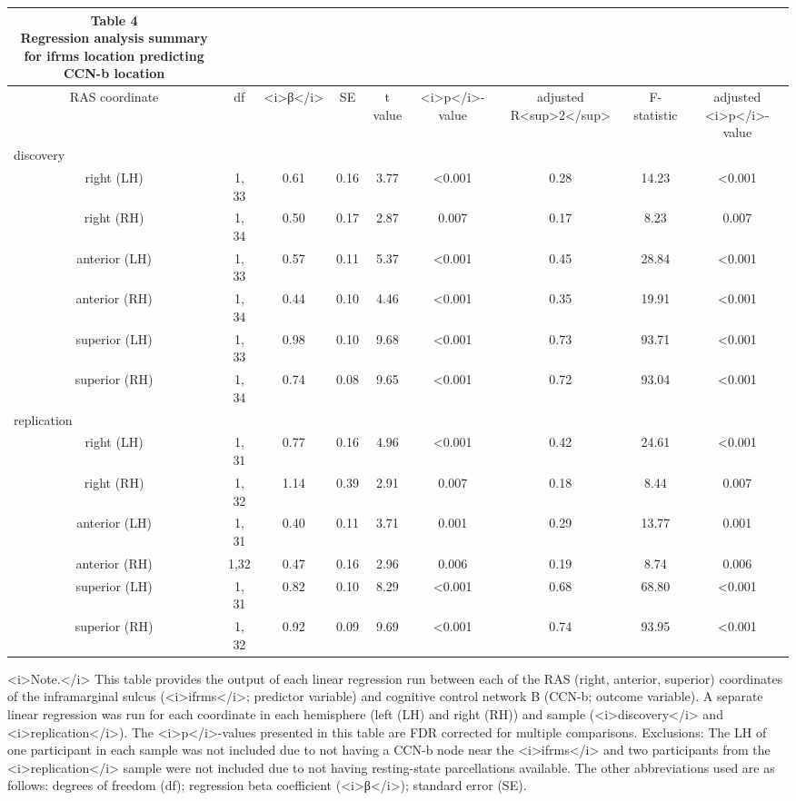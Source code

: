 \documentclass[
]{article}
\begin{document}
\captionsetup[table]{labelformat=empty,skip=1pt}
\begin{longtable}{ccccccccc}
\caption*{
\large Table 4\\ 
\small Regression analysis summary for ifrms location predicting CCN-b location\\ 
} \\ 
\toprule
RAS coordinate & df & <i>β</i> & SE & t value & <i>p</i>-value & adjusted R<sup>2</sup> & F-statistic & adjusted <i>p</i>-value \\ 
\midrule
\multicolumn{1}{l}{discovery} \\ 
\midrule
right (LH) & 1, 33 & 0.61 & 0.16 & 3.77 & <0.001 & 0.28 & 14.23 & <0.001 \\ 
right (RH) & 1, 34 & 0.50 & 0.17 & 2.87 & 0.007 & 0.17 & 8.23 & 0.007 \\ 
anterior (LH) & 1, 33 & 0.57 & 0.11 & 5.37 & <0.001 & 0.45 & 28.84 & <0.001 \\ 
anterior (RH) & 1, 34 & 0.44 & 0.10 & 4.46 & <0.001 & 0.35 & 19.91 & <0.001 \\ 
superior (LH) & 1, 33 & 0.98 & 0.10 & 9.68 & <0.001 & 0.73 & 93.71 & <0.001 \\ 
superior (RH) & 1, 34 & 0.74 & 0.08 & 9.65 & <0.001 & 0.72 & 93.04 & <0.001 \\ 
\midrule
\multicolumn{1}{l}{replication} \\ 
\midrule
right (LH) & 1, 31 & 0.77 & 0.16 & 4.96 & <0.001 & 0.42 & 24.61 & <0.001 \\ 
right (RH) & 1, 32 & 1.14 & 0.39 & 2.91 & 0.007 & 0.18 & 8.44 & 0.007 \\ 
anterior (LH) & 1, 31 & 0.40 & 0.11 & 3.71 & 0.001 & 0.29 & 13.77 & 0.001 \\ 
anterior (RH) & 1,32 & 0.47 & 0.16 & 2.96 & 0.006 & 0.19 & 8.74 & 0.006 \\ 
superior (LH) & 1, 31 & 0.82 & 0.10 & 8.29 & <0.001 & 0.68 & 68.80 & <0.001 \\ 
superior (RH) & 1, 32 & 0.92 & 0.09 & 9.69 & <0.001 & 0.74 & 93.95 & <0.001 \\ 
\bottomrule
\end{longtable}
\begin{minipage}{\linewidth}
<i>Note.</i> This table provides the output of each linear regression run between each of the RAS (right, anterior, superior) coordinates of the inframarginal sulcus (<i>ifrms</i>; predictor variable) and cognitive control network B (CCN-b; outcome variable). A separate linear regression was run for each coordinate in each hemisphere (left (LH) and right (RH)) and sample (<i>discovery</i> and <i>replication</i>). The <i>p</i>-values presented in this table are FDR corrected for multiple comparisons. Exclusions: The LH of one participant in each sample was not included due to not having a CCN-b node near the <i>ifrms</i> and two participants from the <i>replication</i> sample were not included due to not having resting-state parcellations available. The other abbreviations used are as follows: degrees of freedom (df); regression beta coefficient (<i>β</i>); standard error (SE).\\ 
\end{minipage}
\end{document}
